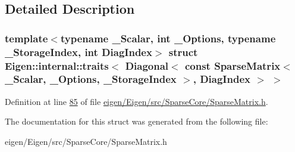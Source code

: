 \subsection{Detailed Description}
\subsubsection*{template$<$typename \+\_\+\+Scalar, int \+\_\+\+Options, typename \+\_\+\+Storage\+Index, int Diag\+Index$>$\newline
struct Eigen\+::internal\+::traits$<$ Diagonal$<$ const Sparse\+Matrix$<$ \+\_\+\+Scalar, \+\_\+\+Options, \+\_\+\+Storage\+Index $>$, Diag\+Index $>$ $>$}



Definition at line \hyperlink{eigen_2_eigen_2src_2_sparse_core_2_sparse_matrix_8h_source_l00085}{85} of file \hyperlink{eigen_2_eigen_2src_2_sparse_core_2_sparse_matrix_8h_source}{eigen/\+Eigen/src/\+Sparse\+Core/\+Sparse\+Matrix.\+h}.



The documentation for this struct was generated from the following file\+:\begin{DoxyCompactItemize}
\item 
eigen/\+Eigen/src/\+Sparse\+Core/\+Sparse\+Matrix.\+h\end{DoxyCompactItemize}
